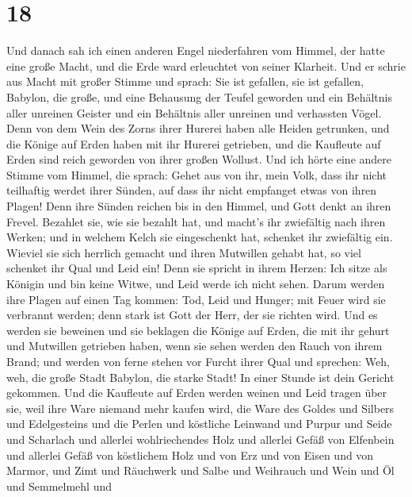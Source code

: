 \hypertarget{section-17}{%
\section{18}\label{section-17}}

 Und danach sah ich einen anderen Engel niederfahren vom
Himmel, der hatte eine große Macht, und die Erde ward erleuchtet von
seiner Klarheit.  Und er schrie aus Macht mit großer
Stimme und sprach: Sie ist gefallen, sie ist gefallen, Babylon, die
große, und eine Behausung der Teufel geworden und ein Behältnis aller
unreinen Geister und ein Behältnis aller unreinen und verhassten Vögel.
 Denn von dem Wein des Zorns ihrer Hurerei haben alle
Heiden getrunken, und die Könige auf Erden haben mit ihr Hurerei
getrieben, und die Kaufleute auf Erden sind reich geworden von ihrer
großen Wollust.  Und ich hörte eine andere Stimme vom
Himmel, die sprach: Gehet aus von ihr, mein Volk, dass ihr nicht
teilhaftig werdet ihrer Sünden, auf dass ihr nicht empfanget etwas von
ihren Plagen!  Denn ihre Sünden reichen bis in den Himmel,
und Gott denkt an ihren Frevel.  Bezahlet sie, wie sie
bezahlt hat, und macht's ihr zwiefältig nach ihren Werken; und in
welchem Kelch sie eingeschenkt hat, schenket ihr zwiefältig ein.
 Wieviel sie sich herrlich gemacht und ihren Mutwillen
gehabt hat, so viel schenket ihr Qual und Leid ein! Denn sie spricht in
ihrem Herzen: Ich sitze als Königin und bin keine Witwe, und Leid werde
ich nicht sehen.  Darum werden ihre Plagen auf einen Tag
kommen: Tod, Leid und Hunger; mit Feuer wird sie verbrannt werden; denn
stark ist Gott der Herr, der sie richten wird.  Und es
werden sie beweinen und sie beklagen die Könige auf Erden, die mit ihr
gehurt und Mutwillen getrieben haben, wenn sie sehen werden den Rauch
von ihrem Brand;  und werden von ferne stehen vor Furcht
ihrer Qual und sprechen: Weh, weh, die große Stadt Babylon, die starke
Stadt! In einer Stunde ist dein Gericht gekommen.  Und
die Kaufleute auf Erden werden weinen und Leid tragen über sie, weil
ihre Ware niemand mehr kaufen wird,  die Ware des Goldes
und Silbers und Edelgesteins und die Perlen und köstliche Leinwand und
Purpur und Seide und Scharlach und allerlei wohlriechendes Holz und
allerlei Gefäß von Elfenbein und allerlei Gefäß von köstlichem Holz und
von Erz und von Eisen und von Marmor,  und Zimt und
Räuchwerk und Salbe und Weihrauch und Wein und Öl und Semmelmehl und
